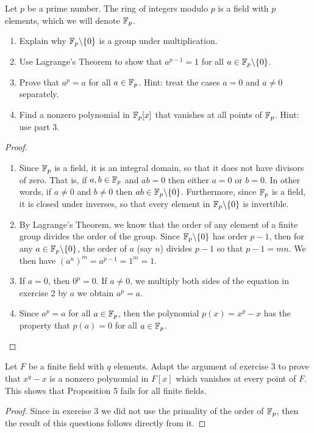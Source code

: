 \begin{exercise}{3}
Let $p$ be a prime number. The ring of integers modulo $p$ is a field with $p$ elements, which we will denote $\mathbb{F}_p$.
\begin{enumerate}
    \item Explain why $\mathbb{F}_p\backslash\{0\}$ is a group under multiplication.
    \item Use Lagrange's Theorem to show that $a^{p-1}=1$ for all $a\in \mathbb{F}_p\backslash\{0\}$.
    \item Prove that $a^p=a$ for all $a\in\mathbb{F}_p$. Hint: treat the cases $a=0$ and $a\neq 0$ separately.
    \item Find a nonzero polynomial in $\mathbb{F}_p[x]$ that vanishes at all points of $\mathbb{F}_p$. Hint: use part 3.
\end{enumerate}
\end{exercise}
\begin{proof}
 \begin{enumerate}
     \item Since $\mathbb{F}_p$ is a field, it is an integral domain, so that it does not have divisors of zero. That is, if $a,b\in\mathbb{F}_p$ and $ab=0$ then either $a=0$ or $b=0$. In other words, if $a\neq 0$ and $b\neq 0$ then $ab\in\mathbb{F}_p\backslash\{0\}$. Furthermore, since $\mathbb{F}_p$  is a field, it is closed under inverses, so that every element in $\mathbb{F}_p\backslash\{0\}$ is invertible.
     \item By Lagrange's Theorem, we know that the order of any element of a finite group divides the order of the group. Since $\mathbb{F}_p\backslash\{0\}$ has order $p-1$, then for any $a\in\mathbb{F}_p\backslash\{0\}$, the order of $a$ (say $n$) divides $p-1$ so that $p-1=mn$. We then have $(a^n)^m=a^{p-1}=1^m=1$.
     \item If $a=0$, then $0^p=0$. If $a\neq 0$, we multiply both sides of the equation in exercise 2 by $a$ we obtain $a^p=a$.
     \item Since $a^p=a$ for all $a\in\mathbb{F}_p$, then the polynomial $p(x)=x^p-x$ has the property that $p(a)=0$ for all $a\in\mathbb{F}_p$.
 \end{enumerate}
\end{proof}

\begin{exercise}{4}
Let $F$ be a finite field with $q$ elements. Adapt the argument of exercise 3 to prove that $x^q-x$ is a nonzero polynomial in $F[x]$ which vanishes at every point of $F$. This shows that Proposition 5 fails for all finite fields.
\end{exercise}
\begin{proof}
 Since in exercise 3 we did not use the primality of the order of $\mathbb{F}_p$, then the result of this questions follows directly from it.
\end{proof}
